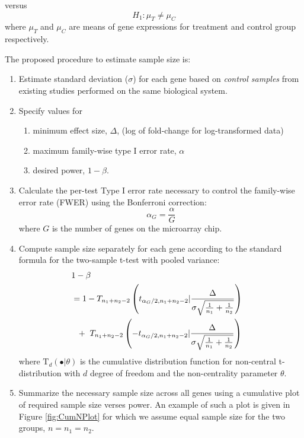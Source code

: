 \documentclass[12pt]{article}
\begin{document}
versus
\begin{equation}
  H_1: \mu_{T} \neq \mu_{C} \nonumber
\end{equation}
where $\mu_{T}$ and $\mu_{C}$ are means of gene expressions for
treatment and control group respectively.

The proposed procedure to estimate sample size is:

\begin{enumerate}
\item{Estimate standard deviation ($\sigma$) for each gene based on
    \emph{control samples} from existing studies performed on the
    same biological system.}

\item{Specify values for
    \begin{enumerate}
    \item minimum effect size, $\Delta$, (log of fold-change for
          log-transformed data)
    \item maximum family-wise type I error rate, $\alpha$
    \item desired power, $1 - \beta$.
    \end{enumerate}
  }

\item{Calculate the per-test Type I error rate necessary to control
      the family-wise error rate (FWER) using the Bonferroni correction:}
\begin{equation}
  \alpha_G = \frac{\alpha}{G}
\end{equation}
%
where $G$ is the number of genes on the microarray chip.

\item{Compute sample size separately for each gene according to the
    standard formula for the two-sample t-test with pooled variance:}
  \begin{eqnarray}
    \lefteqn{1-\beta} \nonumber \\
    &= 1-T_{n_1+n_2-2} \left( t_{\alpha_G/2,n_1+n_2-2} | \frac{\Delta}{\sigma \sqrt{\frac{1}{n_1} + \frac{1}{n_2}}}\right) \nonumber \\
    &  ~~+~T_{n_1+n_2-2} \left( -t_{\alpha_G/2,n_1+n_2-2} | \frac{\Delta}{\sigma \sqrt{\frac{1}{n_1} + \frac{1}{n_2}}}\right)
    \label{eq:formula}
  \end{eqnarray}
  where $\mathrm{T}_{d}(\bullet|\theta)$ is the cumulative
  distribution function for non-central t-distribution with $d$ degree
  of freedom and the non-centrality parameter $\theta$.

\item{Summarize the necessary sample size across all genes using a
      cumulative plot of required sample size verses power. An
      example of such a plot is given in Figure \ref{fig:CumNPlot}
      for which we assume equal sample size for the two groups, $n =
      n_1 = n_2$.}

\end{enumerate}
\end{document}
